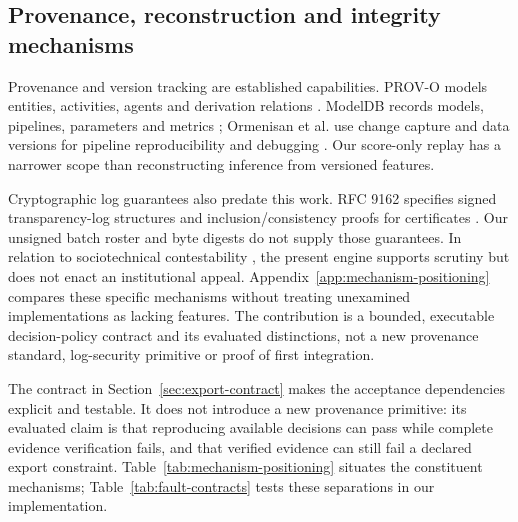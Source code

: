 \subsection{Provenance, reconstruction and integrity mechanisms}
Provenance and version tracking are established capabilities. PROV-O models entities, activities, agents and derivation relations \cite{Lebo2013PROVO}. ModelDB records models, pipelines, parameters and metrics \cite{Vartak2016ModelDB}; Ormenisan et al. use change capture and data versions for pipeline reproducibility and debugging \cite{Ormenisan2020TimeTravel}. Our score-only replay has a narrower scope than reconstructing inference from versioned features.

Cryptographic log guarantees also predate this work. RFC 9162 specifies signed transparency-log structures and inclusion/consistency proofs for certificates \cite{Laurie2021RFC9162}. Our unsigned batch roster and byte digests do not supply those guarantees. In relation to sociotechnical contestability \cite{Alfrink2023ContestableAI}, the present engine supports scrutiny but does not enact an institutional appeal. Appendix~\ref{app:mechanism-positioning} compares these specific mechanisms without treating unexamined implementations as lacking features. The contribution is a bounded, executable decision-policy contract and its evaluated distinctions, not a new provenance standard, log-security primitive or proof of first integration.

The contract in Section~\ref{sec:export-contract} makes the acceptance dependencies explicit and testable. It does not introduce a new provenance primitive: its evaluated claim is that reproducing available decisions can pass while complete evidence verification fails, and that verified evidence can still fail a declared export constraint. Table~\ref{tab:mechanism-positioning} situates the constituent mechanisms; Table~\ref{tab:fault-contracts} tests these separations in our implementation.
